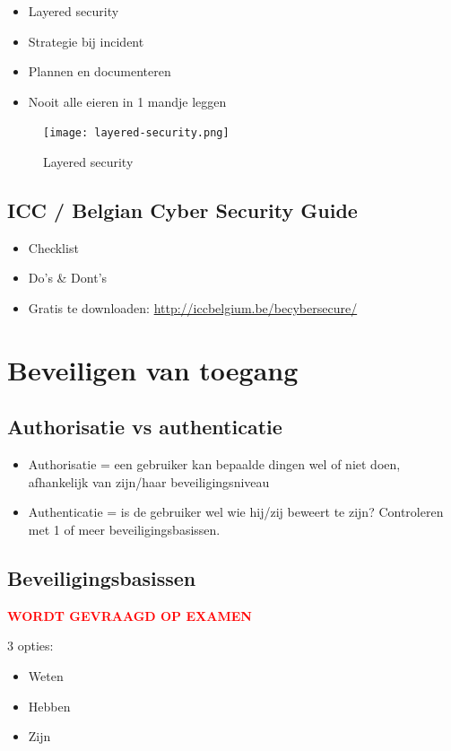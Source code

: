\documentclass{article}
\newcommand{\bold}[1]{\textbf{#1}}
\begin{document}
\begin{itemize}
    \item Layered security
    \item Strategie bij incident
    \item Plannen en documenteren
    \item Nooit alle eieren in 1 mandje leggen
\end{itemize}

\begin{figure}[H]
    \centering
    \texttt{[image: layered-security.png]}
    \caption{Layered security}
\end{figure}

\subsection{ICC / Belgian Cyber Security Guide}

\begin{itemize}
    \item Checklist
    \item Do's \& Dont's
    \item Gratis te downloaden: \url{http://iccbelgium.be/becybersecure/}
\end{itemize}


\section{Beveiligen van toegang}

\subsection{Authorisatie vs authenticatie}

\begin{itemize}
    \item Authorisatie = een gebruiker kan bepaalde dingen wel of niet doen, afhankelijk van zijn/haar beveiligingsniveau
    \item Authenticatie = is de gebruiker wel wie hij/zij beweert te zijn? Controleren met 1 of meer beveiligingsbasissen.
\end{itemize}

\subsection{Beveiligingsbasissen}
\textcolor{red}{\bold{WORDT GEVRAAGD OP EXAMEN}}

3 opties: 
\begin{itemize}
    \item Weten
    \item Hebben
    \item Zijn
\end{itemize}
\end{document}

